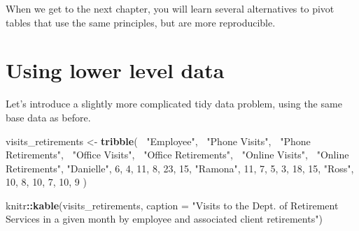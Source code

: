 \documentclass[]{book}
\newenvironment{Shaded}{\begin{snugshade}}{\end{snugshade}}
\newcommand{\KeywordTok}[1]{\textcolor[rgb]{0.13,0.29,0.53}{\textbf{#1}}}
\newcommand{\DataTypeTok}[1]{\textcolor[rgb]{0.13,0.29,0.53}{#1}}
\newcommand{\DecValTok}[1]{\textcolor[rgb]{0.00,0.00,0.81}{#1}}
\newcommand{\StringTok}[1]{\textcolor[rgb]{0.31,0.60,0.02}{#1}}
\newcommand{\OperatorTok}[1]{\textcolor[rgb]{0.81,0.36,0.00}{\textbf{#1}}}
\newcommand{\NormalTok}[1]{#1}
\begin{document}
\begin{Shaded}
\end{Shaded}

\hypertarget{htmlwidget-b92334b9d9e93c3857d1}{}

When we get to the next chapter, you will learn several alternatives to
pivot tables that use the same principles, but are more reproducible.

\section{Using lower level data}\label{using-lower-level-data}

Let's introduce a slightly more complicated tidy data problem, using the
same base data as before.

\begin{Shaded}
\begin{Highlighting}[]
\NormalTok{visits_retirements <-}\StringTok{ }\KeywordTok{tribble}\NormalTok{(}
  \OperatorTok{~}\StringTok{"Employee"}\NormalTok{, }\OperatorTok{~}\StringTok{"Phone Visits"}\NormalTok{, }\OperatorTok{~}\StringTok{"Phone Retirements"}\NormalTok{, }\OperatorTok{~}\StringTok{"Office Visits"}\NormalTok{, }\OperatorTok{~}\StringTok{"Office Retirements"}\NormalTok{, }\OperatorTok{~}\StringTok{"Online Visits"}\NormalTok{, }\OperatorTok{~}\StringTok{"Online Retirements"}\NormalTok{,}
  \StringTok{"Danielle"}\NormalTok{, }\DecValTok{6}\NormalTok{, }\DecValTok{4}\NormalTok{, }\DecValTok{11}\NormalTok{, }\DecValTok{8}\NormalTok{, }\DecValTok{23}\NormalTok{, }\DecValTok{15}\NormalTok{,}
  \StringTok{"Ramona"}\NormalTok{, }\DecValTok{11}\NormalTok{, }\DecValTok{7}\NormalTok{, }\DecValTok{5}\NormalTok{, }\DecValTok{3}\NormalTok{, }\DecValTok{18}\NormalTok{, }\DecValTok{15}\NormalTok{,}
  \StringTok{"Ross"}\NormalTok{, }\DecValTok{10}\NormalTok{, }\DecValTok{8}\NormalTok{, }\DecValTok{10}\NormalTok{, }\DecValTok{7}\NormalTok{, }\DecValTok{10}\NormalTok{, }\DecValTok{9} 
\NormalTok{)}

\NormalTok{knitr}\OperatorTok{::}\KeywordTok{kable}\NormalTok{(visits_retirements, }\DataTypeTok{caption =} \StringTok{"Visits to the Dept. of Retirement Services in a given month by employee and associated client retirements"}\NormalTok{)}
\end{Highlighting}
\end{Shaded}
\end{document}
